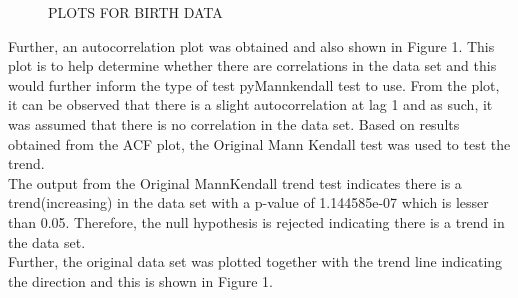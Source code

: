 \documentclass[11]{article}
\begin{document}
\begin{figure}
		    \caption{PLOTS FOR BIRTH DATA}
		        \label{fig:1}
\end{figure}
Further, an  autocorrelation plot was obtained and also shown in Figure 1. This plot is to help determine whether there are correlations in the data set and this would further inform the type of test pyMannkendall test to use. From the plot, it can be observed that there is a slight autocorrelation at lag 1 and as such, it was assumed that there is no correlation in the data set.                                                                                    
Based on results obtained from the ACF plot, the Original Mann Kendall test was used to test the trend.\\The output from the Original MannKendall trend test indicates there is a trend(increasing) in the data set with a p-value of 1.144585e-07 which is lesser than 0.05. Therefore, the null hypothesis is rejected indicating there is a trend in the data set.\\ Further, the original data set was plotted together with the trend line indicating the direction and this is shown in Figure 1.
\end{document}
